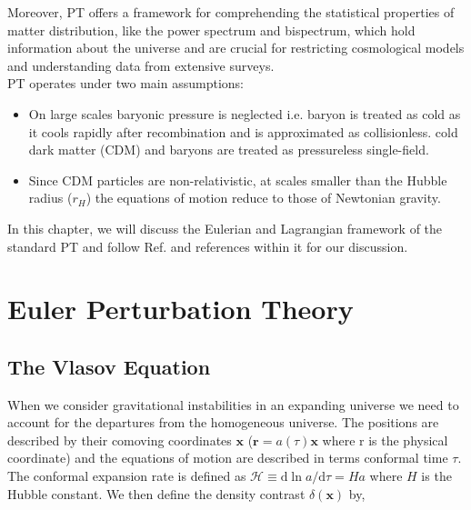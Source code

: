 Moreover, PT offers a framework for comprehending the statistical properties of matter distribution, like the power spectrum and bispectrum, which hold information about the universe and are crucial for restricting cosmological models and understanding data from extensive surveys.\\

PT operates under two main assumptions:\\
\begin{itemize}
    \item On large scales baryonic pressure is neglected i.e. baryon is treated as cold as it cools rapidly after recombination and is approximated as collisionless. cold dark matter (CDM) and baryons are treated as pressureless single-field.

    \item Since CDM particles are non-relativistic, at scales smaller than the Hubble radius ($r_{H}$) the equations of motion reduce to those of Newtonian gravity.
\end{itemize}

In this chapter, we will discuss the Eulerian and Lagrangian framework of the standard PT and follow Ref. \cite{Bernardeau_2002} and references within it for our discussion.



\section{Euler Perturbation Theory}


\subsection{The Vlasov Equation}

When we consider gravitational instabilities in an expanding universe we need to account for the departures from the homogeneous universe. The positions are described by their comoving coordinates $\mathbf{x}$ ($\mathbf{r}=a(\tau) \mathbf{x}$ where r is the physical coordinate) and the equations of motion are described in terms conformal time  $\tau$. The conformal expansion rate is defined as  $\mathcal{H} \equiv \mathrm{d} \ln a / \mathrm{d} \tau=H a$  where $H$ is the Hubble constant.
We then define the density contrast $\delta(\mathbf{x})$ by,

